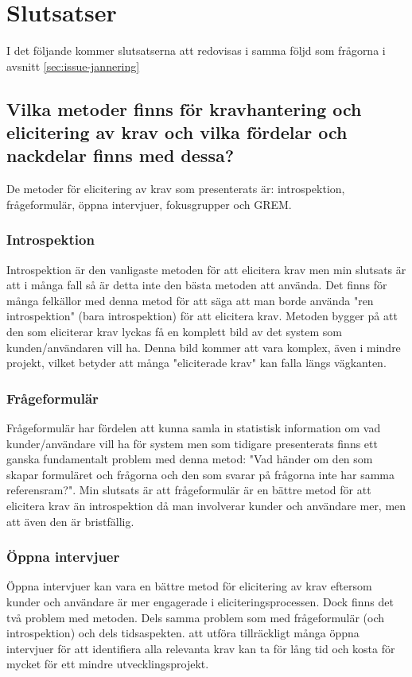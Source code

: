\section{Slutsatser}
I det följande kommer slutsatserna att redovisas i samma följd som frågorna i avsnitt \ref{sec:issue-jannering}
\label{sec:conclusions-jannering}
\subsection{Vilka metoder finns för kravhantering och elicitering av krav och vilka fördelar och nackdelar finns med dessa?}
De metoder för elicitering av krav som presenterats är: introspektion, frågeformulär, öppna intervjuer, fokusgrupper och GREM.

\subsubsection{Introspektion}
Introspektion är den vanligaste metoden för att elicitera krav men min slutsats är att i många fall så är detta inte den bästa metoden att använda. Det finns för många felkällor med denna metod för att säga att man borde använda "ren introspektion" (bara introspektion) för att elicitera krav. Metoden bygger på att den som eliciterar krav lyckas få en komplett bild av det system som kunden/användaren vill ha. Denna bild kommer att vara komplex, även i mindre projekt, vilket betyder att många "eliciterade krav" kan falla längs vägkanten.

\subsubsection{Frågeformulär}
Frågeformulär har fördelen att kunna samla in statistisk information om vad kunder/användare vill ha för system men som tidigare presenterats finns ett ganska fundamentalt problem med denna metod: "Vad händer om den som skapar formuläret och frågorna och den som svarar på frågorna inte har samma referensram?". Min slutsats är att frågeformulär är en bättre metod för att elicitera krav än introspektion då man involverar kunder och användare mer, men att även den är bristfällig.

\subsubsection{Öppna intervjuer}
Öppna intervjuer kan vara en bättre metod för elicitering av krav eftersom kunder och användare är mer engagerade i eliciteringsprocessen. Dock finns det två problem med metoden. Dels samma problem som med frågeformulär (och introspektion) och dels tidsaspekten. att utföra tillräckligt många öppna intervjuer för att identifiera alla relevanta krav kan ta för lång tid och kosta för mycket för ett mindre utvecklingsprojekt.

